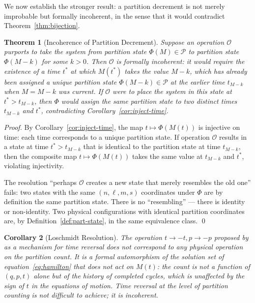 \documentclass[twocolumn,10pt,a4paper]{article}
\theoremstyle{thmstyle}
\newtheorem{theorem}{Theorem}[section]
\newtheorem{corollary}[theorem]{Corollary}
\theoremstyle{definition}
\theoremstyle{remark}
\newcommand{\Parts}{\mathcal{P}}
\newcommand{\PhiMap}{\varPhi}
\begin{document}
We now establish the stronger result: a partition decrement is not merely improbable but formally incoherent, in the sense that it would contradict Theorem~\ref{thm:bijection}.

\begin{theorem}[Incoherence of Partition Decrement]
\label{thm:incoherence}
Suppose an operation $\mathcal{O}$ purports to take the system from partition state $\PhiMap(M) \in \Parts$ to partition state $\PhiMap(M - k)$ for some $k > 0$. Then $\mathcal{O}$ is formally incoherent: it would require the existence of a time $t^*$ at which $M(t^*)$ takes the value $M - k$, which has already been assigned a unique partition state $\PhiMap(M - k) \in \Parts$ at the earlier time $t_{M-k}$ when $M = M - k$ was current. If $\mathcal{O}$ were to place the system in this state at $t^* > t_{M-k}$, then $\PhiMap$ would assign the same partition state to two distinct times $t_{M-k}$ and $t^*$, contradicting Corollary~\ref{cor:inject-time}.
\end{theorem}

\begin{proof}
By Corollary~\ref{cor:inject-time}, the map $t \mapsto \PhiMap(M(t))$ is injective on time: each time corresponds to a unique partition state. If operation $\mathcal{O}$ results in a state at time $t^* > t_{M-k}$ that is identical to the partition state at time $t_{M-k}$, then the composite map $t \mapsto \PhiMap(M(t))$ takes the same value at $t_{M-k}$ and $t^*$, violating injectivity.

The resolution ``perhaps $\mathcal{O}$ creates a new state that merely resembles the old one'' fails: two states with the same $(n, \ell, m, s)$ coordinates under $\PhiMap$ are by definition the same partition state. There is no ``resembling'' --- there is identity or non-identity. Two physical configurations with identical partition coordinates are, by Definition~\ref{def:part-state}, in the same equivalence class. \qed
\end{proof}

\begin{corollary}[Loschmidt Resolution]
\label{cor:loschmidt}
The operation $t \to -t, p \to -p$ proposed by \citet{loschmidt1876,loschmidt1877} as a mechanism for time reversal does not correspond to any physical operation on the partition count. It is a formal automorphism of the solution set of equation~\eqref{eq:hamilton} that does not act on $M(t)$: the count is not a function of $(q, p, t)$ alone but of the \emph{history} of completed cycles, which is unaffected by the sign of $t$ in the equations of motion. Time reversal at the level of partition counting is not difficult to achieve; it is incoherent.
\end{corollary}
\end{document}
